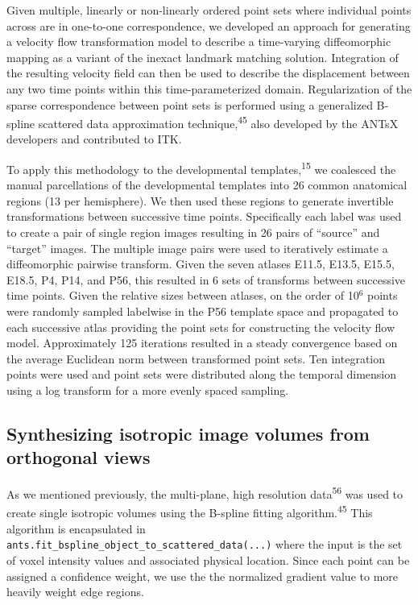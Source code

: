 \documentclass[
  12pt,
]{article}
\begin{document}
Given multiple, linearly or non-linearly ordered point sets where
individual points across are in one-to-one correspondence, we developed
an approach for generating a velocity flow transformation model to
describe a time-varying diffeomorphic mapping as a variant of the
inexact landmark matching solution. Integration of the resulting
velocity field can then be used to describe the displacement between any
two time points within this time-parameterized domain. Regularization of
the sparse correspondence between point sets is performed using a
generalized B-spline scattered data approximation
technique,\textsuperscript{45} also developed by the ANTsX developers
and contributed to ITK.

To apply this methodology to the developmental
templates,\textsuperscript{15} we coalesced the manual parcellations of
the developmental templates into 26 common anatomical regions (13 per
hemisphere). We then used these regions to generate invertible
transformations between successive time points. Specifically each label
was used to create a pair of single region images resulting in 26 pairs
of ``source'' and ``target'' images. The multiple image pairs were used
to iteratively estimate a diffeomorphic pairwise transform. Given the
seven atlases E11.5, E13.5, E15.5, E18.5, P4, P14, and P56, this
resulted in 6 sets of transforms between successive time points. Given
the relative sizes between atlases, on the order of 10\(^6\) points were
randomly sampled labelwise in the P56 template space and propagated to
each successive atlas providing the point sets for constructing the
velocity flow model. Approximately 125 iterations resulted in a steady
convergence based on the average Euclidean norm between transformed
point sets. Ten integration points were used and point sets were
distributed along the temporal dimension using a log transform for a
more evenly spaced sampling.

\hypertarget{synthesizing-isotropic-image-volumes-from-orthogonal-views}{%
\subsection*{Synthesizing isotropic image volumes from orthogonal
views}\label{synthesizing-isotropic-image-volumes-from-orthogonal-views}}

As we mentioned previously, the multi-plane, high resolution
data\textsuperscript{56} was used to create single isotropic volumes
using the B-spline fitting algorithm.\textsuperscript{45} This algorithm
is encapsulated in
\texttt{ants.fit\_bspline\_object\_to\_scattered\_data(...)} where the
input is the set of voxel intensity values and associated physical
location. Since each point can be assigned a confidence weight, we use
the the normalized gradient value to more heavily weight edge regions.
\end{document}
